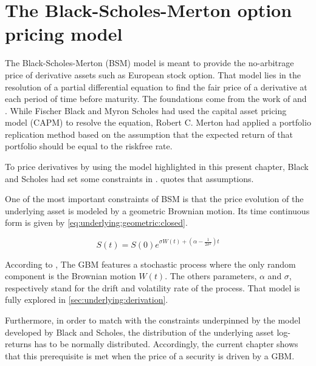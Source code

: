 \documentclass[a4paper, 12pt]{report}
\newcommand{\BSM}{Black--Scholes--Merton }
\newcommand{\Bm}{W\left(t\right)}
\newcommand{\St}{S\left(t\right)}
\newcommand{\Si}{S\left(0\right)}
\newcommand{\Scontinuous}{\St = \Si e^{\sigma\Bm + \left(\alpha - \frac{1}{2 \sigma^2}\right)t}}
\begin{document}
%
%
\chapter{The Black-Scholes-Merton option pricing model}
\label{cha:bsm}

The Black-Scholes-Merton (BSM) model is meant to provide the no-arbitrage price of derivative assets such as European stock option. 
That model lies in the resolution of a partial differential equation to find the fair price of a derivative at each period of time before maturity.
The foundations come from the work of \citet{bs} and \citet{merton73}. 
While Fischer Black and Myron Scholes had used the capital asset pricing model (CAPM) to resolve the equation, Robert C. Merton had applied a portfolio replication method based on the assumption that the expected return of that portfolio should be equal to the riskfree rate. 



To price derivatives by using the model highlighted in this present chapter, Black and Scholes had set some constraints in \citet{bs}. 
 quotes that assumptions. 


  
One of the most important constraints of BSM is that the price evolution of the underlying asset is modeled by a geometric Brownian motion. Its time continuous form is given by  \cref{eq:underlying:geometric:closed}.


\begin{center}
  \begin{equation}
    \Scontinuous
    \label{eq:underlying:geometric:closed}
  \end{equation}
\end{center}
According to \citet{shreve}, The  GBM features a stochastic process where the only random component is the Brownian motion $\Bm$. 
The others parameters, $\alpha$ and $\sigma$,  respectively stand for the drift and volatility rate of the process.
That model is fully explored in \cref{sec:underlying:derivation}.


 
Furthermore, in order to match with the constraints underpinned by the model developed by Black and Scholes, the distribution of the underlying asset log-returns has to be normally distributed.
Accordingly, the current chapter shows that this prerequisite is met when the price of a security is driven by a GBM.
\end{document}
